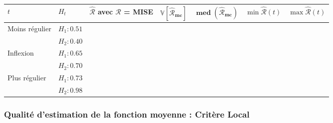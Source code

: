 \begin{table}[H]
	\centering
	\begin{tabularx}{\linewidth}{|X|X|X|X|X|X|X|}
		\toprule
		$t$                                  & $H_t$        & $\widehat{\mathcal R}$ avec $\mathcal R$ = MISE & $\mathbf{\mathds V[\widehat{\mathcal R}_{mc}]}$ & $\mathbf{\operatorname{med}(\widehat{\mathcal R}_{mc})}$ & $\min \widehat{\mathcal R}(t)$ & $\max \widehat{\mathcal R}(t)$ \\
		\midrule
		\multirow{2}{\hsize}{Moins régulier} & $H_1 : 0.51$ &                                      &                                                 &                                                          &                                &
		\\
		                                     & $H_2 : 0.40$ &                                      &                                                 &                                                          &                                &
		\\
		\midrule
		\multirow{2}{\hsize}{Inflexion}      & $H_1 : 0.65$ &                                      &                                                 &                                                          &                                &
		\\
		                                     & $H_2 : 0.70$ &                                      &                                                 &                                                          &                                &
		\\
		\midrule
		\multirow{2}{\hsize}{Plus régulier}  & $H_1 : 0.73$ &                                      &                                                 &                                                          &                                &
		\\
		                                     & $H_2 : 0.98$ &                                      &                                                 &                                                          &                                &
		\\
		\bottomrule
	\end{tabularx}
\end{table}

\subsubsection{Qualité d'estimation de la fonction moyenne : Critère Local}

